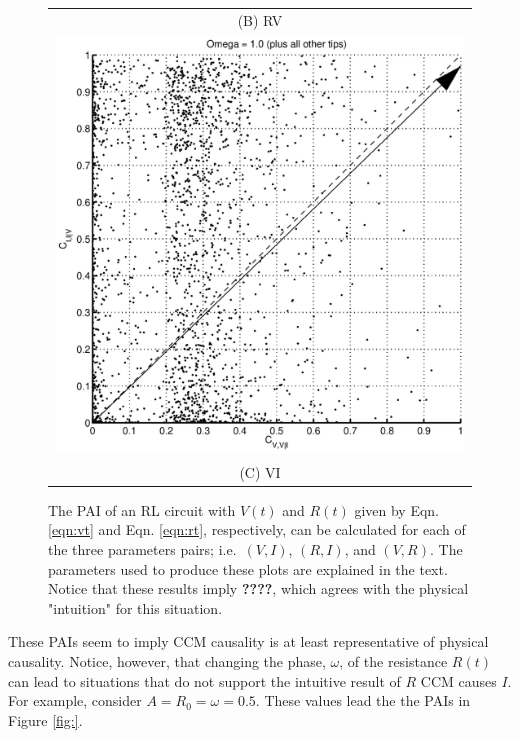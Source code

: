 \documentclass[a4paper,11pt]{article}
\begin{document}
\begin{figure}
\begin{tabular}{c}
(B) RV \\[6pt]
\includegraphics[scale=0.45]{Figure5C.eps}\\
(C) VI\\[6pt]\end{tabular}
\caption{The PAI of an RL circuit with $V(t)$ and $R(t)$ given by Eqn. \ref{eqn:vt} and Eqn. \ref{eqn:rt}, respectively, can be calculated for each of the three parameters pairs; i.e.\ $(V,I)$, $(R,I)$, and $(V,R)$.  The parameters used to produce these plots are explained in the text.  Notice that these results imply {\bf ????}, which agrees with the physical "intuition" for this situation.}
\end{figure}
These PAIs seem to imply CCM causality is at least representative of physical causality.  Notice, however, that changing the phase, $\omega$, of the resistance $R(t)$ can lead to situations that do not support the intuitive result of $R$ CCM causes $I$.  For example, consider $A=R_0=\omega=0.5$.  These values lead the the PAIs in Figure \ref{fig:}.
\end{document}
